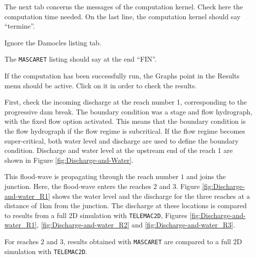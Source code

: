 \documentclass[a4paper,12pt]{article}
\begin{document}
\vspace{0.5cm}

The next tab concerns the messages of the computation kernel. Check
here the computation time needed. On the last line, the computation
kernel should say {}``termine''.

\vspace{0.5cm}

Ignore the Damocles listing tab.

\vspace{0.5cm}

The \texttt{MASCARET} listing should say at the end {}``FIN''.

\vspace{0.5cm}

If the computation has been successfully run, the Graphs point in the Results menu
should be active. Click on it in order to check the results.

\vspace{0.5cm}

First, check the incoming discharge at the reach number 1, corresponding
to the progressive dam break. The boundary condition was a stage and
flow hydrograph, with the fixed flow option activated. This means
that the boundary condition is the flow hydrograph if the flow regime
is subcritical. If the flow regime becomes super-critical, both
water level and discharge are used to define the boundary condition.
Discharge and water level at the upstream end of the reach 1 are shown
in Figure \ref{fig:Discharge-and-Water}. 

\vspace{0.5cm}

This flood-wave is propagating through the reach number $1$ and joins
the junction. Here, the flood-wave enters the reaches $2$ and $3$. Figure
\ref{fig:Discharge-and-water_R1} shows the water level and the discharge
for the three reaches at a distance of 1km from the junction. The
discharge at these locations is compared to results from a full 2D simulation
with \texttt{TELEMAC2D}, Figures \ref{fig:Discharge-and-water_R1}, \ref{fig:Discharge-and-water_R2}
and \ref{fig:Discharge-and-water_R3}. 

\vspace{0.5cm}

For reaches $2$ and $3$, results obtained with \texttt{MASCARET} are compared
to a full 2D simulation with \texttt{TELEMAC2D}. 

\newpage
\end{document}
